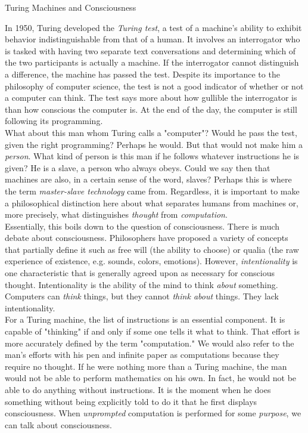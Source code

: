 \begin{bluebox}{Turing Machines and Consciousness}

    In 1950, Turing developed the \textit{Turing test}, a test of a machine's ability to exhibit behavior indistinguishable from that of a human. It involves an interrogator who is tasked with having two separate text conversations and determining which of the two participants is actually a machine. If the interrogator cannot distinguish a difference, the machine has passed the test. Despite its importance to the philosophy of computer science, the test is not a good indicator of whether or not a computer can think. The test says more about how gullible the interrogator is than how conscious the computer is. At the end of the day, the computer is still following its programming. \\
        
    What about this man whom Turing calls a "computer"? Would he pass the test, given the right programming? Perhaps he would. But that would not make him a \textit{person}. What kind of person is this man if he follows whatever instructions he is given? He is a slave, a person who always obeys. Could we say then that machines are also, in a certain sense of the word, slaves? Perhaps this is where the term \textit{master-slave technology} came from. Regardless, it is important to make a philosophical distinction here about what separates humans from machines or, more precisely, what distinguishes \textit{thought} from \textit{computation}. \\
        
    Essentially, this boils down to the question of consciousness. There is much debate about consciousness. Philosophers have proposed a variety of concepts that partially define it such as free will (the ability to choose) or qualia (the raw experience of existence, e.g. sounds, colors, emotions). However, \textit{intentionality} is one characteristic that is generally agreed upon as necessary for conscious thought. Intentionality is the ability of the mind to think \textit{about} something. Computers can \textit{think} things, but they cannot \textit{think about} things. They lack intentionality.\\
        
    For a Turing machine, the list of instructions is an essential component. It is capable of "thinking" if and only if some one tells it what to think. That effort is more accurately defined by the term "computation." We would also refer to the man's efforts with his pen and infinite paper as computations because they require no thought. If he were nothing more than a Turing machine, the man would not be able to perform mathematics on his own. In fact, he would not be able to do anything without instructions. It is the moment when he does something without being explicitly told to do it that he first displays consciousness. When \textit{unprompted} computation is performed for some \textit{purpose}, we can talk about consciousness. \\
        

\end{bluebox}
